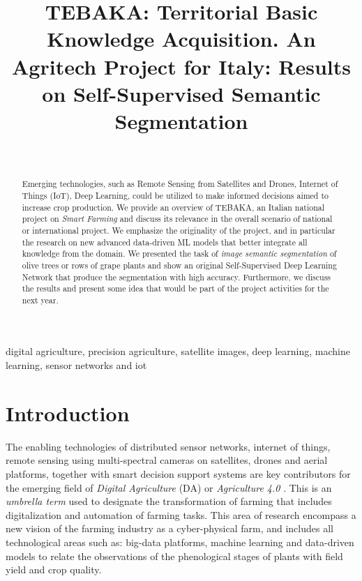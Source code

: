 \documentclass[comsoc,final]{IEEEtran}
\begin{document}

\title{\textsc{TEBAKA}: Territorial Basic Knowledge Acquisition. An Agritech Project for Italy: Results on Self-Supervised Semantic Segmentation}
\author{\\
}

\maketitle

\begin{abstract}
Emerging technologies, such as Remote Sensing from Satellites and Drones, 
Internet of Things (IoT), Deep Learning, could be utilized to make informed decisions aimed to increase crop production. We provide an overview of \textsc{TEBAKA}, an Italian national project on \emph{Smart Farming} and discuss its relevance in the overall scenario of national or international project. We emphasize the originality of the project, and in particular the research on new advanced data-driven ML models that better integrate all knowledge from the domain.
We presented the task of \emph{image semantic segmentation} of olive trees or rows of grape plants and show an original Self-Supervised Deep Learning Network that produce the segmentation with high accuracy. Furthermore, we discuss the results and present some idea that would be part of the 
project activities for the next year.
\end{abstract}

\begin{IEEEkeywords}
digital agriculture, precision agriculture, satellite images, deep learning, machine learning,
sensor networks and iot
\end{IEEEkeywords}


\section{Introduction}

The enabling technologies of distributed sensor networks, internet of things, remote sensing using multi-spectral cameras on satellites, drones and aerial platforms, together with smart decision support systems are key contributors for the emerging field of \emph{Digital Agriculture} (DA) or \emph{Agriculture 4.0} \cite{de2018agriculture}. 
This is an \emph{umbrella term} used to designate the transformation of farming that includes digitalization and automation of farming tasks. This area of research encompass a new vision of the farming industry as a cyber-physical farm, and includes all technological areas such as: big-data platforms, machine learning and data-driven models to relate the observations of the phenological stages of plants with field yield and crop quality. 
\end{document}
